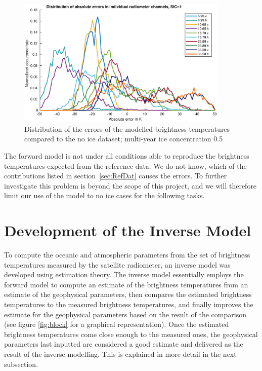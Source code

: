\documentclass[11pt, a4paper]{article}
\begin{document}
\begin{figure}[h!]
   \centering
   \includegraphics[width=0.9\textwidth]{ValidationForward_SIC1_errordist.eps}
   \caption{Distribution of the errors of the modelled brightness temperatures compared to the no ice dataset; multi-year ice concentration 0.5}
   \label{fig:for1dist}
\end{figure}



The forward model is not under all conditions able to reproduce the brightness temperatures expected from the reference data. We do not know, which of the contributions listed in \mbox{section \ref{sec:RefDat}} causes the errors. To further investigate this problem is beyond the scope of this project, and we will therefore limit our use of the model to no ice cases for the following tasks.











\clearpage
\section{Development of the Inverse Model}

To compute the oceanic and atmospheric parameters from the set of brightness temperatures measured by the satellite radiometer, an inverse model was developed using estimation theory. The inverse model essentially employs the forward model to compute an estimate of the brightness temperatures from an estimate of the geophysical parameters, then compares the estimated brightness temperatures to the measured brightness temperatures, and finally improves the estimate for the geophysical parameters based on the result of the comparison (see figure \ref{fig:block} for a graphical representation). Once the estimated brightness temperatures come close enough to the measured ones, the geophysical parameters last inputted are considered a good estimate and delivered as the result of the inverse modelling. This is explained in more detail in the next subsection.
\newline
\end{document}
